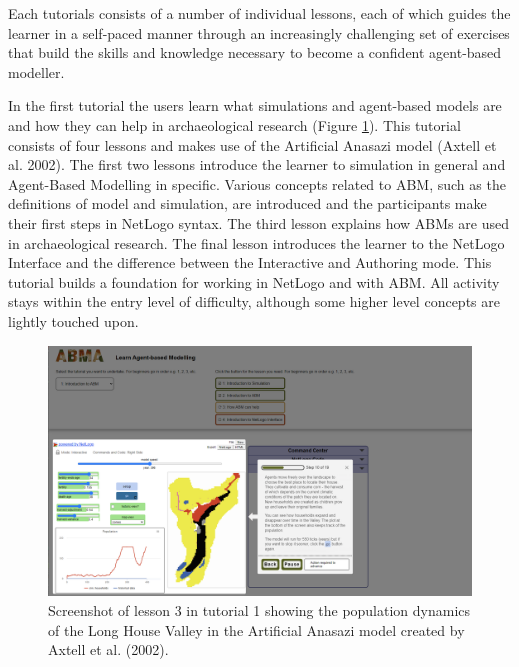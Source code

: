 \documentclass[
]{article}
\begin{document}
Each tutorials consists of a number of individual lessons, each of which guides the learner in a self-paced manner through an increasingly challenging set of exercises that build the skills and knowledge necessary to become a confident agent-based modeller.

In the first tutorial the users learn what simulations and agent-based models are and how they can help in archaeological research (Figure \ref{fig:screenshot-lesson-3}). This tutorial consists of four lessons and makes use of the Artificial Anasazi model (Axtell et al. 2002). The first two lessons introduce the learner to simulation in general and Agent-Based Modelling in specific. Various concepts related to ABM, such as the definitions of model and simulation, are introduced and the participants make their first steps in NetLogo syntax. The third lesson explains how ABMs are used in archaeological research. The final lesson introduces the learner to the NetLogo Interface and the difference between the Interactive and Authoring mode. This tutorial builds a foundation for working in NetLogo and with ABM. All activity stays within the entry level of difficulty, although some higher level concepts are lightly touched upon.

\begin{figure}
\includegraphics[width=1\linewidth]{paper_files/ScreenshotABMAtutorial1lesson3} \caption{Screenshot of lesson 3 in tutorial 1 showing the population dynamics of the Long House Valley in the Artificial Anasazi model created by Axtell et al. (2002).}\label{fig:screenshot-lesson-3}
\end{figure}
\end{document}
